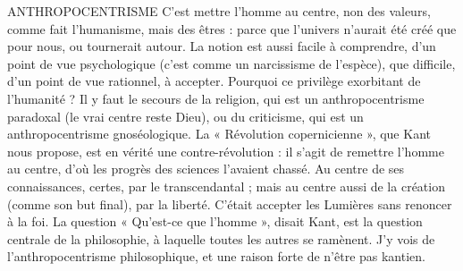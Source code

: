 ANTHROPOCENTRISME C'est mettre l’homme au centre, non des valeurs,
comme fait l’humanisme, mais des êtres : parce
que l'univers n'aurait été créé que pour nous, ou tournerait autour. La notion
est aussi facile à comprendre, d’un point de vue psychologique (c’est comme un
narcissisme de l'espèce), que difficile, d’un point de vue rationnel, à accepter.
Pourquoi ce privilège exorbitant de l'humanité ? Il y faut le secours de la religion,
qui est un anthropocentrisme paradoxal (le vrai centre reste Dieu), ou du
criticisme, qui est un anthropocentrisme gnoséologique. La « Révolution
copernicienne », que Kant nous propose, est en vérité une contre-révolution : il
s’agit de remettre l’homme au centre, d’où les progrès des sciences l'avaient
chassé. Au centre de ses connaissances, certes, par le transcendantal ; mais au
centre aussi de la création (comme son but final), par la liberté. C'était accepter
les Lumières sans renoncer à la foi. La question « Qu'est-ce que l’homme »,
disait Kant, est la question centrale de la philosophie, à laquelle toutes les autres
se ramènent. J'y vois de l’anthropocentrisme philosophique, et une raison forte
de n’être pas kantien.

